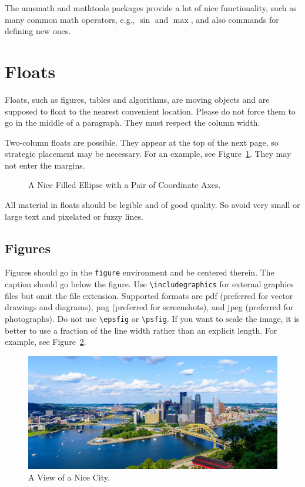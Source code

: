 \documentclass{uai2023} %
\begin{document}
The \textsf{amsmath} and \textsf{mathtools} packages provide a lot of nice functionality, such as many common math operators, e.g., \(\sin\) and \(\max\), and also commands for defining new ones.

\section{Floats}\label{sec:floats}
Floats, such as figures, tables and algorithms, are moving objects and are supposed to float to the nearest convenient location.
Please do not force them to go in the middle of a paragraph.
They must respect the column width.

Two-column floats are possible.
They appear at the top of the next page, so strategic placement may be necessary.
For an example, see Figure~\ref{fig:tikz}.
They may not enter the margins.
\begin{figure}
    \centering
    \caption{A Nice Filled Ellipse with a Pair of Coordinate Axes.}\label{fig:tikz}
\end{figure}

All material in floats should be legible and of good quality.
So avoid very small or large text and pixelated or fuzzy lines.

\subsection{Figures}\label{sec:figures}
Figures should go in the \texttt{figure} environment and be centered therein.
The caption should go below the figure.
Use \verb|\includegraphics| for external graphics files but omit the file extension.
Supported formats are \textsf{pdf} (preferred for vector drawings and diagrams), \textsf{png} (preferred for screenshots), and \textsf{jpeg} (preferred for photographs).
Do not use \verb|\epsfig| or \verb|\psfig|.
If you want to scale the image, it is better to use a fraction of the line width rather than an explicit length.
For example, see Figure~\ref{fig:pitt}.

\begin{figure}[!htb]
  \centering
  \includegraphics[width=0.7\linewidth]{pitt}
  \caption{A View of a Nice City.}\label{fig:pitt}
\end{figure}
\end{document}
